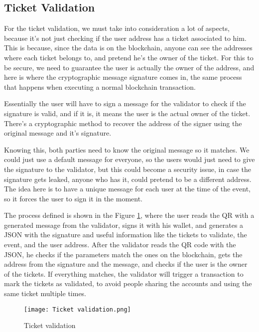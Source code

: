 \subsection{Ticket Validation}
\label{subsec:ticket_validation}

For the ticket validation, we must take into consideration a lot of aspects, because it's not just checking if the user address has a ticket associated to him. This is because, since the data is on the blockchain, anyone can see the addresses where each ticket belongs to, and pretend he's the owner of the ticket. For this to be secure, we need to guarantee the user is actually the owner of the address, and here is where the cryptographic message signature comes in, the same process that happens when executing a normal blockchain transaction.

Essentially the user will have to sign a message for the validator to check if the signature is valid, and if it is, it means the user is the actual owner of the ticket. There's a cryptographic method to recover the address of the signer using the original message and it's signature.

Knowing this, both parties need to know the original message so it matches. We could just use a default message for everyone, so the users would just need to give the signature to the validator, but this could become a security issue, in case the signature gets leaked, anyone who has it, could pretend to be a different address. The idea here is to have a unique message for each user at the time of the event, so it forces the user to sign it in the moment.

The process defined is shown in the Figure \ref{fig:ticket_validation}, where the user reads the QR with a generated message from the validator, signs it with his wallet, and generates a JSON with the signature and useful information like the tickets to validate, the event, and the user address. After the validator reads the QR code with the JSON, he checks if the parameters match the ones on the blockchain, gets the address from the signature and the message, and checks if the user is the owner of the tickets. If everything matches, the validator will trigger a transaction to mark the tickets as validated, to avoid people sharing the accounts and using the same ticket multiple times.

\begin{figure}[H]
    \texttt{[image: Ticket validation.png]}
    \centering
    \caption{Ticket validation}
    \label{fig:ticket_validation}
\end{figure}

